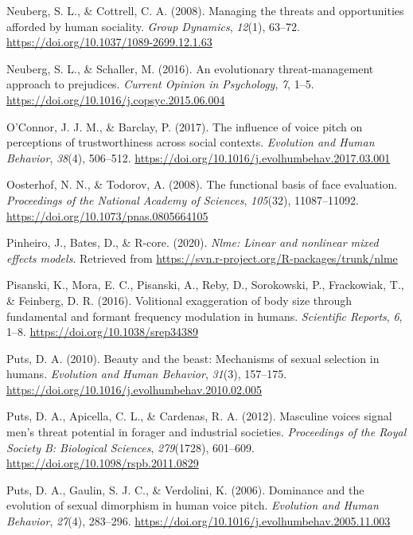 \documentclass[
  english,
  man, noextraspace,floatsintext]{apa6}
\newlength{\cslhangindent}
\newenvironment{cslreferences}%
  {\setlength{\parindent}{0pt}%
  \everypar{\setlength{\hangindent}{\cslhangindent}}\ignorespaces}%
  {\par}
\begin{document}
\begin{cslreferences}
\leavevmode\hypertarget{ref-Neuberg2008}{}%
Neuberg, S. L., \& Cottrell, C. A. (2008). Managing the threats and opportunities afforded by human sociality. \emph{Group Dynamics}, \emph{12}(1), 63--72. \url{https://doi.org/10.1037/1089-2699.12.1.63}

\leavevmode\hypertarget{ref-Neuberg2016}{}%
Neuberg, S. L., \& Schaller, M. (2016). An evolutionary threat-management approach to prejudices. \emph{Current Opinion in Psychology}, \emph{7}, 1--5. \url{https://doi.org/10.1016/j.copsyc.2015.06.004}

\leavevmode\hypertarget{ref-OConnor2017}{}%
O'Connor, J. J. M., \& Barclay, P. (2017). The influence of voice pitch on perceptions of trustworthiness across social contexts. \emph{Evolution and Human Behavior}, \emph{38}(4), 506--512. \url{https://doi.org/10.1016/j.evolhumbehav.2017.03.001}

\leavevmode\hypertarget{ref-Oosterhof2008}{}%
Oosterhof, N. N., \& Todorov, A. (2008). The functional basis of face evaluation. \emph{Proceedings of the National Academy of Sciences}, \emph{105}(32), 11087--11092. \url{https://doi.org/10.1073/pnas.0805664105}

\leavevmode\hypertarget{ref-R-nlme}{}%
Pinheiro, J., Bates, D., \& R-core. (2020). \emph{Nlme: Linear and nonlinear mixed effects models}. Retrieved from \url{https://svn.r-project.org/R-packages/trunk/nlme}

\leavevmode\hypertarget{ref-Pisanski2016}{}%
Pisanski, K., Mora, E. C., Pisanski, A., Reby, D., Sorokowski, P., Frackowiak, T., \& Feinberg, D. R. (2016). Volitional exaggeration of body size through fundamental and formant frequency modulation in humans. \emph{Scientific Reports}, \emph{6}, 1--8. \url{https://doi.org/10.1038/srep34389}

\leavevmode\hypertarget{ref-Puts2010}{}%
Puts, D. A. (2010). Beauty and the beast: Mechanisms of sexual selection in humans. \emph{Evolution and Human Behavior}, \emph{31}(3), 157--175. \url{https://doi.org/10.1016/j.evolhumbehav.2010.02.005}

\leavevmode\hypertarget{ref-Puts2012}{}%
Puts, D. A., Apicella, C. L., \& Cardenas, R. A. (2012). Masculine voices signal men's threat potential in forager and industrial societies. \emph{Proceedings of the Royal Society B: Biological Sciences}, \emph{279}(1728), 601--609. \url{https://doi.org/10.1098/rspb.2011.0829}

\leavevmode\hypertarget{ref-Puts2006}{}%
Puts, D. A., Gaulin, S. J. C., \& Verdolini, K. (2006). Dominance and the evolution of sexual dimorphism in human voice pitch. \emph{Evolution and Human Behavior}, \emph{27}(4), 283--296. \url{https://doi.org/10.1016/j.evolhumbehav.2005.11.003}


\end{cslreferences}
\end{document}
